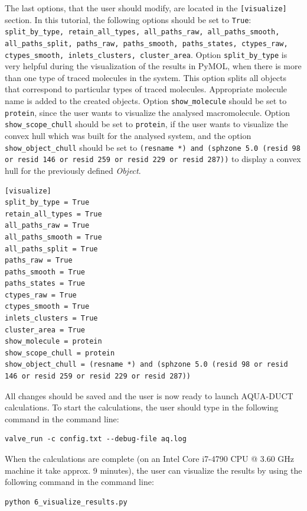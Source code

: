 \documentclass[9pt,tutorial]{livecoms}
\begin{document}
The last options, that the user should modify, are located in the \texttt{[visualize]} section. In this tutorial, the following options should be set to \texttt{True}: \texttt{split\_by\_type, retain\_all\_types, all\_paths\_raw, all\_paths\_smooth, all\_paths\_split, paths\_raw, paths\_smooth, paths\_states, ctypes\_raw, ctypes\_smooth, inlets\_clusters, cluster\_area}. Option \texttt{split\_by\_type} is very helpful during the visualization of the results in PyMOL, when there is more than one type of traced molecules in the system. This option splits all objects that correspond to particular types of traced molecules. Appropriate molecule name is added to the created objects. Option \texttt{show\_molecule} should be set to \texttt{protein}, since the user wants to visualize the analysed macromolecule. Option \texttt{show\_scope\_chull} should be set to \texttt{protein}, if the user wants to visualize the convex hull which was built for the analysed system, and the option \texttt{show\_object\_chull} should be set to \texttt{(resname *) and (sphzone 5.0 (resid 98 or resid 146 or resid 259 or resid 229 or resid 287))} to display a convex hull for the previously defined \emph{Object}. 
\begin{lstlisting}
[visualize]
split_by_type = True
retain_all_types = True
all_paths_raw = True
all_paths_smooth = True
all_paths_split = True
paths_raw = True
paths_smooth = True
paths_states = True
ctypes_raw = True
ctypes_smooth = True
inlets_clusters = True
cluster_area = True
show_molecule = protein
show_scope_chull = protein
show_object_chull = (resname *) and (sphzone 5.0 (resid 98 or resid 146 or resid 259 or resid 229 or resid 287))
\end{lstlisting}

All changes should be saved and the user is now ready to launch AQUA-DUCT calculations. To start the calculations, the user should type in the following command in the command line:
\begin{lstlisting}
valve_run -c config.txt --debug-file aq.log 
\end{lstlisting}

When the calculations are complete (on an Intel Core i7-4790 CPU @ 3.60 GHz machine it take approx. 9 minutes), the user can visualize the results by using the following command in the command line:
\begin{lstlisting}
python 6_visualize_results.py
\end{lstlisting}
\end{document}
